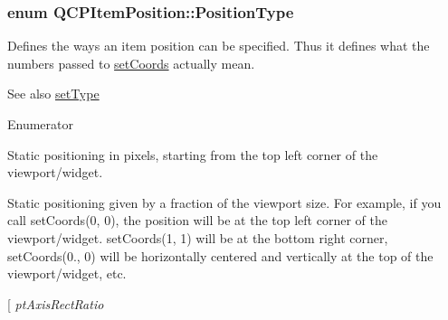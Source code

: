 \subsubsection[{Position\+Type}]{\setlength{\rightskip}{0pt plus 5cm}enum {\bf Q\+C\+P\+Item\+Position\+::\+Position\+Type}}\label{classQCPItemPosition_aad9936c22bf43e3d358552f6e86dbdc8}
Defines the ways an item position can be specified. Thus it defines what the numbers passed to \hyperlink{classQCPItemPosition_aa988ba4e87ab684c9021017dcaba945f}{set\+Coords} actually mean.

\begin{DoxySeeAlso}{See also}
\hyperlink{classQCPItemPosition_aa476abf71ed8fa4c537457ebb1a754ad}{set\+Type} 
\end{DoxySeeAlso}
\begin{Desc}
\item[Enumerator]\par
\begin{description}
\item[{\em 
\hypertarget{classQCPItemPosition_aad9936c22bf43e3d358552f6e86dbdc8a564f5e53e550ead1ec5fc7fc7d0b73e0}{}pt\+Absolute\label{classQCPItemPosition_aad9936c22bf43e3d358552f6e86dbdc8a564f5e53e550ead1ec5fc7fc7d0b73e0}
}]Static positioning in pixels, starting from the top left corner of the viewport/widget. \item[{\em 
\hypertarget{classQCPItemPosition_aad9936c22bf43e3d358552f6e86dbdc8ac7d6aa89ceacb39658b0d6da061c789a}{}pt\+Viewport\+Ratio\label{classQCPItemPosition_aad9936c22bf43e3d358552f6e86dbdc8ac7d6aa89ceacb39658b0d6da061c789a}
}]Static positioning given by a fraction of the viewport size. For example, if you call set\+Coords(0, 0), the position will be at the top left corner of the viewport/widget. set\+Coords(1, 1) will be at the bottom right corner, set\+Coords(0., 0) will be horizontally centered and vertically at the top of the viewport/widget, etc. \item[{\em 
\hypertarget{classQCPItemPosition_aad9936c22bf43e3d358552f6e86dbdc8a01080fd00eaf09fa238ef6b73bbfef75}{}pt\+Axis\+Rect\+Ratio\label{classQCPItemPosition_aad9936c22bf43e3d358552f6e86dbdc8a01080fd00eaf09fa238ef6b73bbfef75}
}
\end{description}
\end{Desc}
